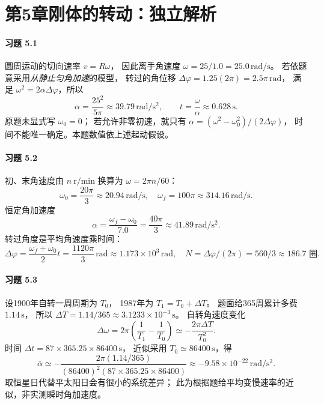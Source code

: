 \section*{第5章\quad 刚体的转动：独立解析}

\paragraph{习题 5.1}
圆周运动的切向速率 \(v=R\omega\)，
因此离手角速度
\(\boxed{\omega=25/1.0=25.0\,\mathrm{rad/s}}\)。
若依题意采用\emph{从静止匀角加速}的模型，
转过的角位移
\(\Delta\varphi=1.25(2\pi)=2.5\pi\,\mathrm{rad}\)，
满足 \(\omega^2=2\alpha\Delta\varphi\)，所以
\[
 \boxed{\alpha=\frac{25^2}{5\pi}
 \approx39.79\,\mathrm{rad/s^2}},\qquad
 \boxed{t=\frac{\omega}{\alpha}
 \approx0.628\,\mathrm s}.
\]
原题未显式写 \(\omega_0=0\)；
若允许非零初速，就只有
\(\alpha=(\omega^2-\omega_0^2)/(2\Delta\varphi)\)，
时间不能唯一确定。本题数值依上述起动假设。

\paragraph{习题 5.2}
初、末角速度由 \(n\ \mathrm{r/min}\)
换算为 \(\omega=2\pi n/60\)：
\[
 \boxed{\omega_0=\frac{20\pi}{3}\approx20.94\,\mathrm{rad/s}},\quad
 \boxed{\omega_f=100\pi\approx314.16\,\mathrm{rad/s}}.
\]
恒定角加速度
\[
 \boxed{\alpha=\frac{\omega_f-\omega_0}{7.0}
 =\frac{40\pi}{3}\approx41.89\,\mathrm{rad/s^2}}.
\]
转过角度是平均角速度乘时间：
\[
 \boxed{\Delta\varphi=\frac{\omega_f+\omega_0}{2}t
 =\frac{1120\pi}{3}\,\mathrm{rad}
 \approx1.173\times10^3\,\mathrm{rad}},\quad
 \boxed{N=\Delta\varphi/(2\pi)=560/3\approx186.7\text{ 圈}}.
\]

\paragraph{习题 5.3}
设1900年自转一周周期为 \(T_0\)，
1987年为 \(T_1=T_0+\Delta T\)。
题面给365周累计多费 \(1.14\,\mathrm s\)，
所以
\(\Delta T=1.14/365\approx3.1233\times10^{-3}\,\mathrm s\)。
自转角速度变化
\[
 \Delta\omega=2\pi\!\left(\frac1{T_1}-\frac1{T_0}\right)
 \simeq-\frac{2\pi\Delta T}{T_0^2}.
\]
时间 \(\Delta t=87\times365.25\times86400\,\mathrm s\)，
近似采用 \(T_0\simeq86400\,\mathrm s\)，得
\[
 \boxed{\overline\alpha\simeq
 -\frac{2\pi(1.14/365)}
 {(86400)^2(87\times365.25\times86400)}
 \approx-9.58\times10^{-22}\,\mathrm{rad/s^2}}.
\]
取恒星日代替平太阳日会有很小的系统差异；
此为根据题给平均变慢速率的近似，非实测瞬时角加速度。

